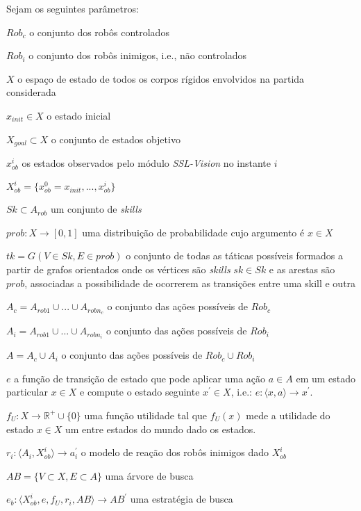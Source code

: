 \begin{defi}[Time]
  Sejam os seguintes parâmetros: 

  \begin{description}
    \item $Rob_c$ o conjunto dos robôs controlados
    \item $Rob_i$ o conjunto dos robôs inimigos, i.e., não controlados
    \item $X$ o espaço de estado de todos os corpos rígidos envolvidos na partida considerada
    \item $x_{init} \in X$ o estado inicial
    \item $X_{goal}\subset X$ o conjunto de estados objetivo
    \item $x_{ob}^{i}$ os estados observados pelo módulo \textit{SSL-Vision} no instante $i$
    \item $X_{ob}^{i} =  \lbrace{x_{ob}^{0} = x_{init},...,x_{ob}^{i}}\rbrace$
    \item $Sk \subset A_{rob}$ um conjunto de \textit{skills}
    \item $prob: X \longrightarrow [0,1]$ uma distribuição de probabilidade cujo argumento é
          $x \in X$
    \item $tk = G(V \in Sk, E \in {prob} )$ o conjunto de todas as táticas possíveis
          formados a partir de grafos orientados onde os vértices são \textit{skills} $sk \in Sk$
          e as arestas são $prob$, associadas a possibilidade de ocorrerem as transições
          entre uma skill e outra
    \item $A_c = A_{rob 1} \cup ... \cup A_{rob n_c}$ o conjunto das ações possíveis de $Rob_c$
    \item $A_i = A_{rob 1} \cup ... \cup A_{rob n_i}$ o conjunto das ações possíveis de $Rob_i$
    \item $A = A_c \cup A_i$ o conjunto das ações possíveis de $Rob_c \cup Rob_i$
    \item $e$ a função de transição de estado que pode aplicar uma ação $a\in A$ em um estado particular
          $x \in X$ e compute o estado seguinte $x^{'} \in X$, i.e.:
          $e: \langle x,a \rangle \longrightarrow x^{'}$.
    \item $f_{U}: X \longrightarrow \mathbb{R^{+}} \cup\lbrace 0\rbrace$ uma função utilidade tal que
          $f_{U}(x)$ mede a utilidade do estado $x \in X$ um entre estados do mundo dado os estados.
    \item $r_i: \langle A_i, X_{ob}^{i}\rangle \longrightarrow a_i^{'}$ o modelo de reação dos robôs
          inimigos dado $X_{ob}^{i}$
    \item $AB =\lbrace V \subset X, E \subset A\rbrace$ uma árvore de busca
    \item $e_b: \langle X_{ob}^{i}, e, f_{U}, r_i, AB\rangle \longrightarrow AB^{'}$ uma estratégia de busca
    

\end{description}
\end{defi}

